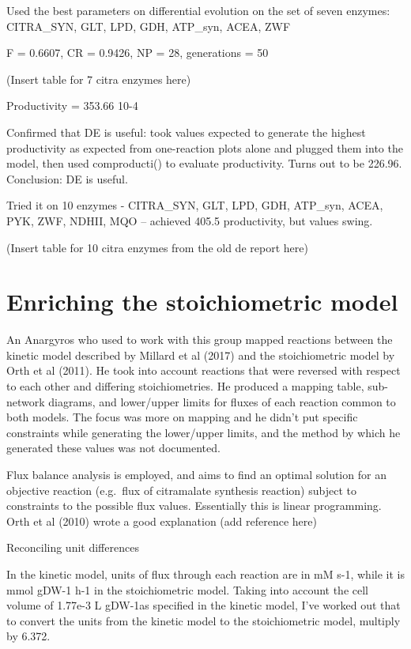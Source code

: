 \documentclass[parskip=full]{scrreprt}
\begin{document}
Used the best parameters on differential evolution on the set of seven enzymes: CITRA\_SYN, GLT, LPD, GDH, ATP\_syn, ACEA, ZWF

F = 0.6607, CR = 0.9426, NP = 28, generations = 50

(Insert table for 7 citra enzymes here)

Productivity = 353.66 10-4

Confirmed that DE is useful: took values expected to generate the highest productivity as expected from one-reaction plots alone and plugged them into the model, then used comproducti() to evaluate productivity. Turns out to be 226.96. Conclusion: DE is useful.

Tried it on 10 enzymes - CITRA\_SYN, GLT, LPD, GDH, ATP\_syn, ACEA, PYK, ZWF, NDHII, MQO -- achieved 405.5 productivity, but values swing.

(Insert table for 10 citra enzymes from the old de report here)

\chapter{Enriching the stoichiometric model}
\label{ch:stoich}

An Anargyros who used to work with this group mapped reactions between the kinetic model described by Millard et al (2017) and the stoichiometric model by Orth et al (2011). He took into account reactions that were reversed with respect to each other and differing stoichiometries. He produced a mapping table, sub-network diagrams, and lower/upper limits for fluxes of each reaction common to both models. The focus was more on mapping and he didn’t put specific constraints while generating the lower/upper limits, and the method by which he generated these values was not documented.

Flux balance analysis is employed, and aims to find an optimal solution for an objective reaction (e.g.\ flux of citramalate synthesis reaction) subject to constraints to the possible flux values. Essentially this is linear programming. Orth et al (2010) wrote a good explanation (add reference here)

Reconciling unit differences

In the kinetic model, units of flux through each reaction are in mM s-1, while it is mmol gDW-1 h-1 in the stoichiometric model. Taking into account the cell volume of 1.77e-3 L gDW-1as specified in the kinetic model, I’ve worked out that to convert the units from the kinetic model to the stoichiometric model, multiply by 6.372.
\end{document}
